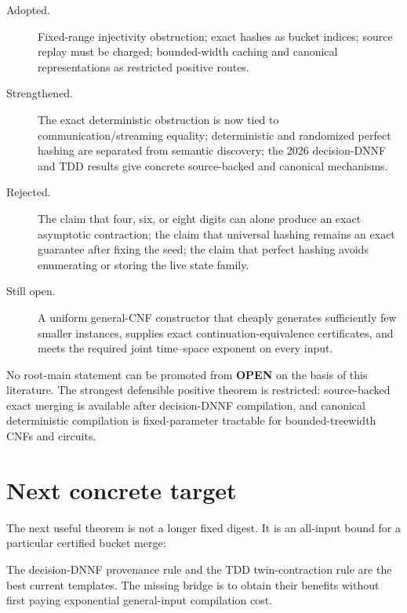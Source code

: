 \documentclass[11pt]{article}
\begin{document}
\begin{description}
\item[Adopted.] Fixed-range injectivity obstruction; exact hashes as bucket
indices; source replay must be charged; bounded-width caching and canonical
representations as restricted positive routes.

\item[Strengthened.] The exact deterministic obstruction is now tied to
communication/streaming equality; deterministic and randomized perfect
hashing are separated from semantic discovery; the 2026 decision-DNNF and TDD
results give concrete source-backed and canonical mechanisms.

\item[Rejected.] The claim that four, six, or eight digits can alone produce
an exact asymptotic contraction; the claim that universal hashing remains an
exact guarantee after fixing the seed; the claim that perfect hashing avoids
enumerating or storing the live state family.

\item[Still open.] A uniform general-CNF constructor that cheaply generates
sufficiently few smaller instances, supplies exact continuation-equivalence
certificates, and meets the required joint time--space exponent on every
input.
\end{description}

No root-main statement can be promoted from \textbf{OPEN} on the basis of
this literature.  The strongest defensible positive theorem is restricted:
source-backed exact merging is available after decision-DNNF compilation,
and canonical deterministic compilation is fixed-parameter tractable for
bounded-treewidth CNFs and circuits.

\section{Next concrete target}

The next useful theorem is not a longer fixed digest.  It is an all-input
bound for a particular certified bucket merge:
\begin{center}
\end{center}
The decision-DNNF provenance rule and the TDD twin-contraction rule are the
best current templates.  The missing bridge is to obtain their benefits
without first paying exponential general-input compilation cost.
\end{document}
